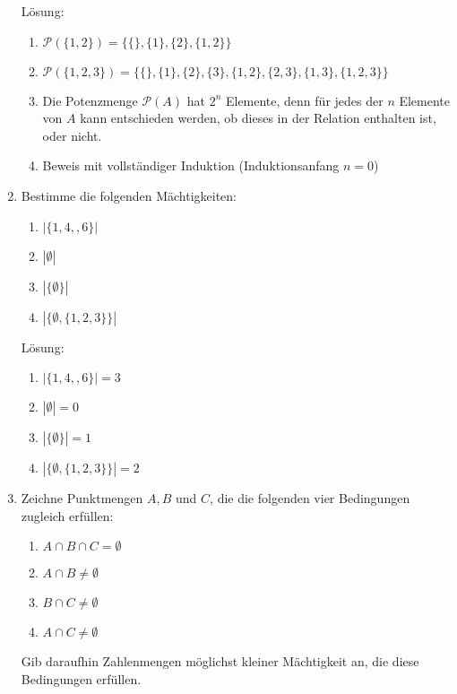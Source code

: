 \documentclass[main.tex]{subfiles}
\begin{document}
\begin{enumerate}
	      Lösung:
	      \begin{enumerate}
		      \item \( \mathcal{P}(\{ 1, 2 \}) = \{ \{\},  \{1\}, \{2 \}, \{1,2\} \} \)
		      \item \( \mathcal{P}(\{ 1, 2, 3\}) = \{ \{\},  \{1\}, \{2 \}, \{3 \}, \{1,2\} , \{2,3\} , \{1,3\}, \{1,2,3\} \} \)
		      \item Die Potenzmenge \( \mathcal{P}(A) \) hat \( 2^n \) Elemente, denn für jedes
		            der \( n \) Elemente von \( A \) kann entschieden werden, ob dieses in der Relation
		            enthalten ist, oder nicht.
		      \item Beweis mit vollständiger Induktion  (Induktionsanfang \( n = 0 \))
	      \end{enumerate}
	\item Bestimme die folgenden Mächtigkeiten:
	      \begin{multicols}{2}
		      \begin{enumerate}
			      \item \( |\{1, 4, ,6 \}| \)
			      \item \( |\emptyset| \)
			      \item \( |\{ \emptyset \}| \)
			      \item \( |\{ \emptyset, \{ 1, 2 ,3 \} \}| \)
		      \end{enumerate}
	      \end{multicols}
	      Lösung:
	      \begin{multicols}{2}
		      \begin{enumerate}
			      \item \( |\{1, 4, ,6 \}|  = 3\)
			      \item \( |\emptyset| = 0 \)
			      \item \( |\{ \emptyset \}| = 1 \)
			      \item \( |\{ \emptyset, \{ 1, 2 ,3 \} \}| = 2 \)
		      \end{enumerate}
	      \end{multicols}
	\item Zeichne Punktmengen \( A, B \) und \( C \), die die folgenden vier Bedingungen
	      zugleich erfüllen:
	      \begin{multicols}{2}
		      \begin{enumerate}
			      \item \( A \cap B \cap C = \emptyset \)
			      \item \( A \cap B \neq \emptyset \)
			      \item \( B \cap C \neq \emptyset \)
			      \item \( A \cap C \neq \emptyset \)
		      \end{enumerate}
	      \end{multicols}
	      Gib daraufhin Zahlenmengen möglichst kleiner Mächtigkeit an, die diese
	      Bedingungen erfüllen.


\end{enumerate}
\end{document}
